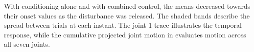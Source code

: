 With conditioning alone and with combined control, the means decreased
towards their onset values as the disturbance was released.
The shaded bands describe the spread between trials at each instant.
The joint-1 trace illustrates the temporal response, while the cumulative
projected joint motion in  evaluates
motion across all seven joints.
